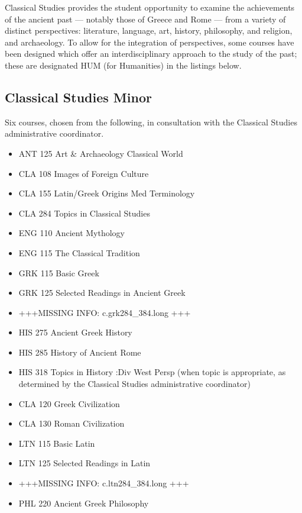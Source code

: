 \documentclass[
  letterpaper,
]{scrbook}
\providecommand{\tightlist}{%
  \setlength{\itemsep}{0pt}\setlength{\parskip}{0pt}}
\begin{document}
Classical Studies provides the student opportunity to examine the
achievements of the ancient past --- notably those of Greece and Rome
--- from a variety of distinct perspectives: literature, language, art,
history, philosophy, and religion, and archaeology. To allow for the
integration of perspectives, some courses have been designed which offer
an interdisciplinary approach to the study of the past; these are
designated HUM (for Humanities) in the listings below.

\subsection{Classical Studies Minor}\label{classical-studies-minor}

Six courses, chosen from the following, in consultation with the
Classical Studies administrative coordinator.

\begin{itemize}
\tightlist
\item
  ANT 125 Art \& Archaeology Classical World
\item
  CLA 108 Images of Foreign Culture
\item
  CLA 155 Latin/Greek Origins Med Terminology
\item
  CLA 284 Topics in Classical Studies
\item
  ENG 110 Ancient Mythology
\item
  ENG 115 The Classical Tradition
\item
  GRK 115 Basic Greek
\item
  GRK 125 Selected Readings in Ancient Greek
\item
  +++MISSING INFO: c.grk284\_384.long +++
\item
  HIS 275 Ancient Greek History
\item
  HIS 285 History of Ancient Rome
\item
  HIS 318 Topics in History :Div West Persp (when topic is appropriate,
  as determined by the Classical Studies administrative coordinator)
\item
  CLA 120 Greek Civilization
\item
  CLA 130 Roman Civilization
\item
  LTN 115 Basic Latin
\item
  LTN 125 Selected Readings in Latin
\item
  +++MISSING INFO: c.ltn284\_384.long +++
\item
  PHL 220 Ancient Greek Philosophy
\end{itemize}
\end{document}
